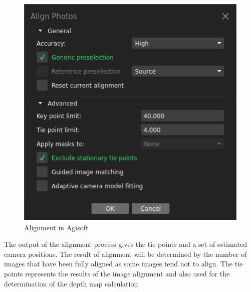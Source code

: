 \begin{figure}[H]
	\centering
	\includegraphics[scale=0.6]{img/alignmet.png}
	\caption{Alignment in Agisoft}
	\label{fig:alignment}
\end{figure}
The output of the alignment process gives the tie points and a set of estimated camera positions. The result of alignment will be determined by the number of images that have been fully aligned as some images tend not to align. The tie points represents the results of the image alignment and also used for the determination of the depth map calculation 

